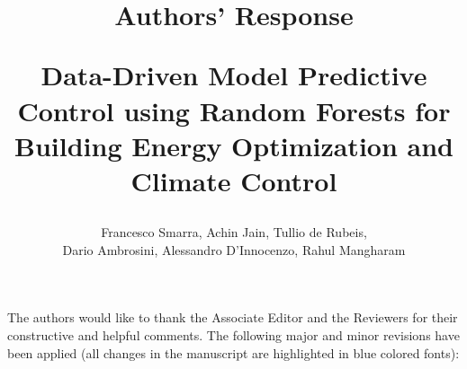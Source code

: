 \documentclass{article}
\begin{document}
\title{Authors' Response \\
\begin{Large}
	Data-Driven Model Predictive Control using Random Forests for Building Energy Optimization and Climate Control
\end{Large}
}

\author{Francesco Smarra, Achin Jain, Tullio de Rubeis, \\ Dario Ambrosini, Alessandro D’Innocenzo, Rahul Mangharam}



\date{}

\maketitle



\bigskip



The authors would like to thank the Associate Editor and the Reviewers for their constructive and helpful comments. The following major and minor revisions have been applied (all changes in the manuscript are highlighted in \textcolor[rgb]{0.00,0.00,1.00}{blue colored fonts}):
\end{document}
